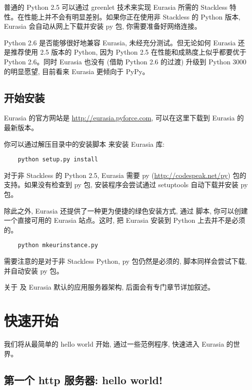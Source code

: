 \documentclass{manual}
\begin{document}
普通的 Python 2.5 可以通过 greenlet 技术来实现 Eurasia 所需的 Stackless 特性。在性能上并不会有明显差别。如果你正在使用非 Stackless 的 Python 版本, Eurasia 会自动从网上下载并安装 py 包, 你需要准备好网络连接。


Python 2.6 是否能够很好地兼容 Eurasia, 未经充分测试。但无论如何 Eurasia 还是推荐使用 2.5 版本的 Python, 因为 Python 2.5 在性能和成熟度上似乎都要优于 Python 2.6。同时 Eurasia 也没有 (借助 Python 2.6 的过渡) 升级到 Python 3000 的明显愿望, 目前看来 Eurasia 更倾向于 PyPy。

\section{开始安装}

Eurasia 的官方网站是 \url{http://eurasia.pyforce.com}, 可以在这里下载到 Eurasia 的最新版本。

你可以通过解压目录中的安装脚本  来安装 Eurasia 库:

\begin{verbatim}
    python setup.py install
\end{verbatim}

对于非 Stackless 的 Python 2.5, Eurasia 需要 py (\url{http://codespeak.net/py}) 包的支持。如果没有检查到 py 包, 安装程序会尝试通过 setuptools 自动下载并安装 py 包。

除此之外, Eurasia 还提供了一种更为便捷的绿色安装方式, 通过  脚本, 你可以创建一个直接可用的 Eurasia 站点。这时, 把 Eurasia 安装到 Python 上去并不是必须的。

\begin{verbatim}
    python mkeurinstance.py
\end{verbatim}

需要注意的是对于非 Stackless Python, py 包仍然是必须的,  脚本同样会尝试下载, 并自动安装 py 包。

关于  及 Eurasia 默认的应用服务器架构, 后面会有专门章节详加叙述。


\chapter{快速开始}

我们将从最简单的 hello world 开始, 通过一些范例程序, 快速进入 Eurasia 的世界。

\section{第一个 http 服务器: hello world!}
\end{document}
